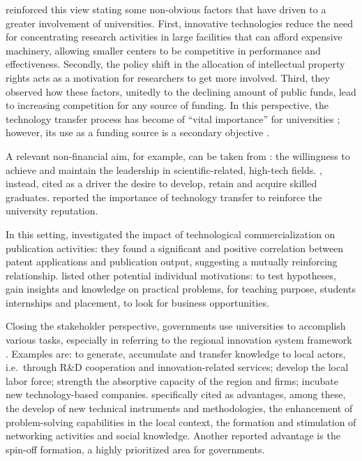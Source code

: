 \citet{Baldini2007} reinforced this view stating some non-obvious factors that have driven to a greater involvement of universities. First, innovative technologies reduce the need for concentrating research activities in large facilities that can afford expensive machinery, allowing smaller centers to be competitive in performance and effectiveness. Secondly, the policy shift in the allocation of intellectual property rights acts as a motivation for researchers to get more involved. Third, they observed how these factors, unitedly to the declining amount of public funds, lead to increasing competition for any source of funding. In this perspective, the technology transfer process has become of \enquote{vital importance} for universities \citep{Muscio2008}; however, its use as a funding source is a secondary objective \citep{Jensen1998}.

A relevant non-financial aim, for example, can be taken from \citet{Tijssen2006}: the willingness to achieve and maintain the leadership in scientific-related, high-tech fields. \citet{Leitch2005}, instead, cited as a driver the desire to develop, retain and acquire skilled graduates. \citet{Baldini2006} reported the importance of technology transfer to reinforce the university reputation. 

In this setting, \citet{Wong2010} investigated the impact of technological commercialization on publication activities: they found a significant and positive correlation between patent applications and publication output, suggesting a mutually reinforcing relationship. \citet{Lee2000} listed other potential individual motivations: to test hypotheses, gain insights and knowledge on practical problems, for teaching purpose, students internships and placement, to look for business opportunities. 

Closing the stakeholder perspective, governments use universities to accomplish various tasks, especially in referring to the regional innovation system framework \citep{Fritsch2007,Balderi2007}. Examples are: to generate, accumulate and transfer knowledge to local actors, i.e.\ through R\&D cooperation and innovation-related services; develop the local labor force; strength the absorptive capacity of the region and firms; incubate new technology-based companies. \citet{AzagraCaro2010} specifically cited as advantages, among these, the develop of new technical instruments and methodologies, the enhancement of problem-solving capabilities in the local context, the formation and stimulation of networking activities and social knowledge. Another reported advantage is the spin-off formation, a highly prioritized area for governments.

